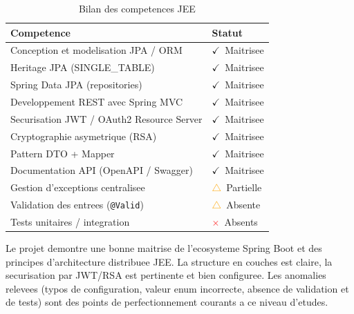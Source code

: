 \documentclass[12pt,a4paper]{report}
\newcommand{\OK}{\textcolor{green!60!black}{$\checkmark$}}
\newcommand{\WARN}{\textcolor{orange}{$\triangle$}}
\newcommand{\ERR}{\textcolor{red}{$\times$}}
\begin{document}
\begin{table}[h!]
\centering
\begin{tabularx}{\linewidth}{X l}
\toprule
\textbf{Competence} & \textbf{Statut} \\
\midrule
Conception et modelisation JPA / ORM        & \OK\ Maitrisee \\
Heritage JPA (SINGLE\_TABLE)               & \OK\ Maitrisee \\
Spring Data JPA (repositories)             & \OK\ Maitrisee \\
Developpement REST avec Spring MVC         & \OK\ Maitrisee \\
Securisation JWT / OAuth2 Resource Server  & \OK\ Maitrisee \\
Cryptographie asymetrique (RSA)            & \OK\ Maitrisee \\
Pattern DTO + Mapper                       & \OK\ Maitrisee \\
Documentation API (OpenAPI / Swagger)      & \OK\ Maitrisee \\
Gestion d'exceptions centralisee           & \WARN\ Partielle \\
Validation des entrees (\texttt{@Valid})   & \WARN\ Absente \\
Tests unitaires / integration              & \ERR\ Absents \\
\bottomrule
\end{tabularx}
\caption{Bilan des competences JEE}
\end{table}

\vspace{1cm}

\begin{tcolorbox}[colback=ensetBlue!8, colframe=ensetBlue,
                  title={Appreciation globale}]
Le projet demontre une bonne maitrise de l'ecosysteme Spring Boot et des
principes d'architecture distribuee JEE. La structure en couches est claire,
la securisation par JWT/RSA est pertinente et bien configuree. Les anomalies
relevees (typos de configuration, valeur enum incorrecte, absence de validation
et de tests) sont des points de perfectionnement courants a ce niveau
d'etudes.
\end{tcolorbox}
\end{document}
